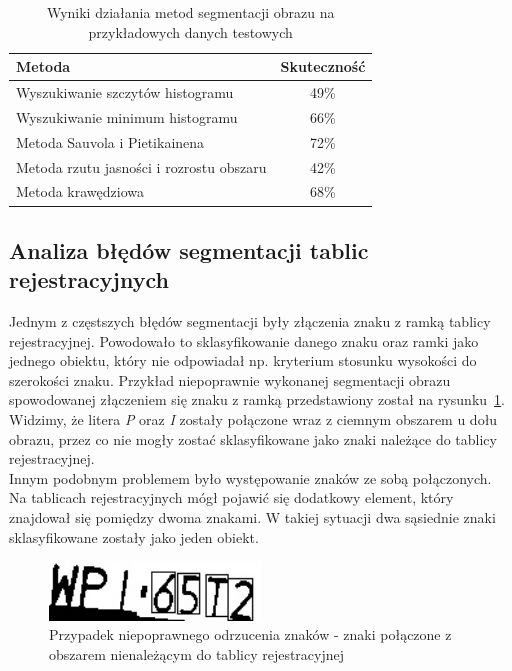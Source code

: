 \begin {table}[H]
  \begin{center}
    \begin{tabular}{l | c}
      Metoda & Skuteczność \\
      \hline
      Wyszukiwanie szczytów histogramu & 49\% \\
      Wyszukiwanie minimum histogramu & 66\% \\
      Metoda Sauvola i Pietikainena & 72\% \\
      Metoda rzutu jasności i rozrostu obszaru & 42\% \\
      Metoda krawędziowa & 68\%
    \end{tabular}
    \caption {Wyniki działania metod segmentacji obrazu na przykładowych danych testowych}
    \label{tab:all_methods_comparision} 
  \end{center}
\end {table}

\subsection{Analiza błędów segmentacji tablic rejestracyjnych}
Jednym z częstszych błędów segmentacji były złączenia znaku z ramką tablicy rejestracyjnej. Powodowało to sklasyfikowanie danego znaku oraz ramki jako jednego obiektu, który nie odpowiadał np. kryterium stosunku wysokości do szerokości znaku. Przykład niepoprawnie wykonanej segmentacji obrazu spowodowanej złączeniem się znaku z ramką przedstawiony został na rysunku~\ref{fig:polaczone_krawedzie}. Widzimy, że litera \textit{P} oraz \textit{I} zostały połączone wraz z ciemnym obszarem u dołu obrazu, przez co nie mogły zostać sklasyfikowane jako znaki należące do tablicy rejestracyjnej. \\
Innym podobnym problemem było występowanie znaków ze sobą połączonych. Na tablicach rejestracyjnych mógł pojawić się dodatkowy element, który znajdował się pomiędzy dwoma znakami. W takiej sytuacji dwa sąsiednie znaki sklasyfikowane zostały jako jeden obiekt. 
\begin{figure}
  \centering
  \includegraphics[width=0.5\textwidth]{img/polaczone-krawedzie}
  \caption{Przypadek niepoprawnego odrzucenia znaków - znaki połączone z obszarem nienależącym do tablicy rejestracyjnej}
  \label{fig:polaczone_krawedzie}
\end{figure}

